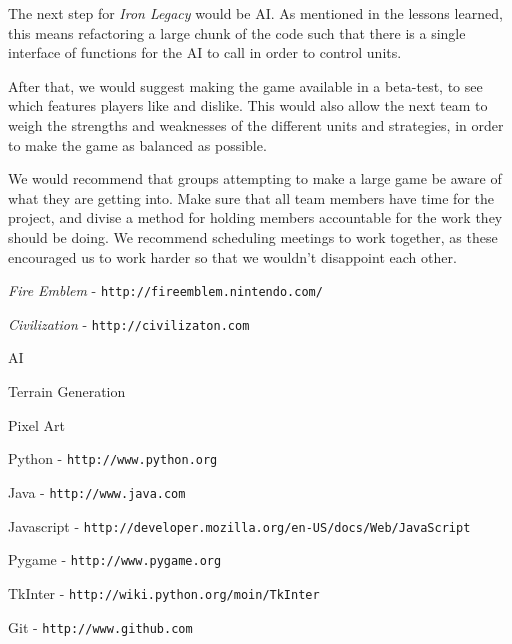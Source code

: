 \documentclass{article}
\begin{document}
The next step for \emph{Iron Legacy} would be AI.
    As mentioned in the lessons learned, this means refactoring a large
    chunk of the code such that there is a single interface
    of functions for the AI to call in order to control units.

After that, we would suggest making the game available in a beta-test,
    to see which features players like and dislike.
    This would also allow the next team to weigh the strengths and weaknesses
    of the different units and strategies, in order to make the game as
    balanced as possible.

We would recommend that groups attempting to make a large game be aware
    of what they are getting into.
    Make sure that all team members have time for the project,
    and divise a method for holding members accountable for the work
    they should be doing.
    We recommend scheduling meetings to work together,
    as these encouraged us to work harder so that we wouldn't disappoint
    each other.

\begin{thebibliography}{99}

\emph{Fire Emblem} - {\tt http://fireemblem.nintendo.com/}

\emph{Civilization} - {\tt http://civilizaton.com}

AI

Terrain Generation

Pixel Art

Python - {\tt http://www.python.org}

Java - {\tt http://www.java.com}

Javascript - {\tt http://developer.mozilla.org/en-US/docs/Web/JavaScript}

Pygame - {\tt http://www.pygame.org}

TkInter - {\tt http://wiki.python.org/moin/TkInter}

Git - {\tt http://www.github.com}

\end{thebibliography}
\end{document}
